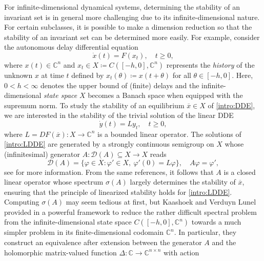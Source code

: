 \documentclass[english]{myarticle}
\begin{document}
\begin{sloppypar}
For infinite-dimensional dynamical systems, determining the stability of an invariant set is in general more challenging due to its infinite-dimensional nature. For certain subclasses, it is possible to make a dimension reduction so that the stability of an invariant set can be determined more easily. For example, consider the autonomous delay differential equation
\begin{equation} \tag{DDE} \label{intro:DDE}
    \dot{x}(t) = F(x_t), \quad t \geq 0,
\end{equation}
where $x(t) \in \mathbb{C}^n$ and $x_t \in X \coloneqq C([-h,0],\mathbb{C}^n)$ represents the \emph{history} of the unknown $x$ at time $t$ defined by $x_t(\theta) \coloneqq x(t+\theta)$ for all $\theta \in [-h,0]$. Here, $0 < h < \infty$ denotes the upper bound of (finite) delays and the infinite-dimensional \emph{state space} $X$ becomes a Banach space when equipped with the supremum norm. To study the stability of an equilibrium $\overline{x} \in X$ of \eqref{intro:DDE}, we are interested in the stability of the trivial solution of the linear DDE
\begin{equation} \tag{LDDE}\label{intro:LDDE}
    \dot{y}(t) = Ly_t, \quad t \geq 0,
\end{equation}
where $L = DF(\overline{x}) : X \to \mathbb{C}^n$ is a bounded linear operator. The solutions of \eqref{intro:LDDE} are generated by a strongly continuous semigroup on $X$ whose (infinitesimal) generator $A : \mathcal{D}(A) \subseteq X \to X$ reads
\begin{equation*}
    \mathcal{D}(A) = \{ \varphi \in X : \varphi' \in X, \ \varphi'(0) = L\varphi \}, \quad A \varphi = \varphi',
\end{equation*}
see \cite{Diekmann1995,Hale1993,Engel2000} for more information. From the same references, it follows that $A$ is a closed linear operator whose spectrum $\sigma(A)$ largely determines the stability of $\overline{x}$, ensuring that the principle of linearized stability holds for \eqref{intro:LDDE}. Computing $\sigma(A)$ may seem tedious at first, but Kaashoek and Verduyn Lunel provided in \cite{Kaashoek1992} a powerful framework to reduce the rather difficult spectral problem from the infinite-dimensional state space $C([-h,0],\mathbb{C}^n)$ towards a much simpler problem in its finite-dimensional codomain $\mathbb{C}^n$. In particular, they construct an equivalence after extension between the generator $A$ and the holomorphic matrix-valued function $\Delta : \mathbb{C} \to \mathbb{C}^{n \times n}$ with action
\begin{equation} \label{intro:Characmatrix}

\end{equation}
\end{sloppypar}
\end{document}
